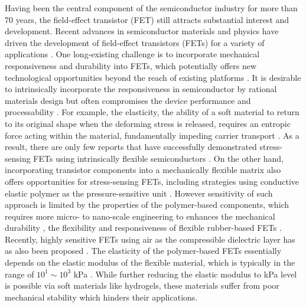 Having been the central component of the semiconductor industry for
more than 70 years, the field-effect transistor (FET) still attracts 
substantial interest and development.
%
Recent advances in semiconductor materials and physics have driven the
development of field-effect transistors (FETs) for a variety of
applications \cite{Torsi_2013_rev,Ben_Sasson_2014_fet_rev}.
%
One
long-existing challenge is to incorporate mechanical responsiveness
and durability into FETs, which potentially offers new technological
opportunities beyond the reach of existing platforms
\cite{Someya_2004,Oh_2016_stretch_polym_FET,Shin_2017_air_FET}. 
%
It is
desirable to intrinsically incorporate the responsiveness in
semiconductor by rational materials design
\cite{Oh_2016_stretch_polym_FET} but often compromises the device
performance and processability \cite{Lee_2018}. For example, the
elasticity, the ability of a soft material to return to its original
shape when the deforming stress is released, requires an entropic
force acting within the material, fundamentally impeding carrier
transport \cite{OConnor_2011_strain_P3HT}.
%
As a result, there are only few reports that have successfully
demonstrated stress-sensing FETs using intrinsically flexible
semiconductors \cite{Oh_2016_stretch_polym_FET}. On the other hand,
incorporating transistor components into a mechanically flexible
matrix also offers opportunities for stress-sensing FETs, including
strategies using conductive elastic polymer as the pressure-sensitive
unit
\cite{Someya_2004,Sekitani_2009,Kaltenbrunner_2013_elastic_device,Takei_2010_NW_skin}.
However sensitivity of such approach is limited by the properties of
the polymer-based components, which requires more micro- to nano-scale
engineering to enhances the mechanical durability
\cite{Jang_2015_soft_network}, the flexibility and responsiveness of
flexible rubber-based FETs
\cite{Mannsfeld_2010_pressure,Schwartz_2013_polymer_transistor}.
Recently, highly sensitive FETs using air as the compressible
dielectric layer has as also been proposed
\cite{Zang_2015_suspend_gate_FET,Shin_2017_air_FET}. The elasticity of
the polymer-based FETs essentially depends on the elastic modulus of
the flexible material, which is typically in the range of
\(10^{1}\sim{}10^{3}\) kPa \cite{Amjadi_2016_stretchable_sensor}.
%
While further reducing the elastic modulus to kPa level is possible
via soft materials like hydrogels, these materials suffer from
 poor mechanical stability which hinders their applications.

